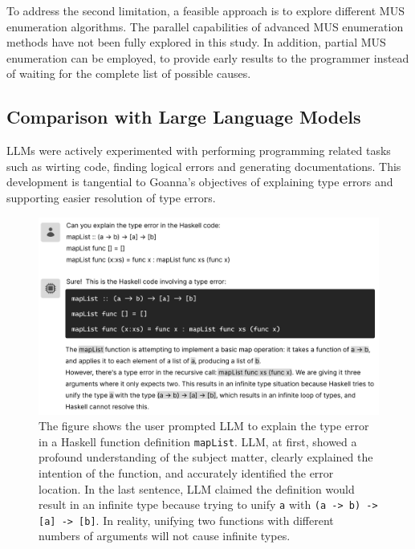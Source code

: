 \documentclass[pdflatex,sn-nature,Numbered]{sn-jnl}%
\begin{document}
To address the second limitation, a feasible approach is to explore different MUS enumeration algorithms. The parallel capabilities of advanced MUS enumeration methods \cite{Zhao2016-bu, Bendik2020-pz} have not been fully explored in this study. In addition, partial MUS enumeration \cite{Previti2013-mr, Liffiton2016-xi} can be employed, to provide early results to the programmer instead of waiting for the complete list of possible causes.


\subsection{Comparison with Large Language Models} \label{sec:llm}
    
LLMs were actively experimented with performing programming related tasks such as wirting code, finding logical errors and generating documentations.  This development is tangential to Goanna's objectives of explaining type errors and supporting easier resolution of type errors. 

\begin{figure}[hbt]
  \includegraphics[width=\linewidth]{images/LLM.pdf}
  \caption[LLM explaining a type error; it began very accurate, then went on to give incorrect and contradicting analysis]{\label{fig:llm}
  The figure shows the user prompted LLM to explain the type error in a Haskell function definition \texttt{mapList}. LLM, at first, showed a profound understanding of the subject matter, clearly explained the intention of the function, and accurately identified the error location. In the last sentence, LLM claimed the definition would result in an infinite type because trying to unify \texttt{a} with \texttt{(a -> b) -> [a] -> [b]}. In reality, unifying two functions with different numbers of arguments will not cause infinite types. 
    }
\end{figure}
\end{document}
